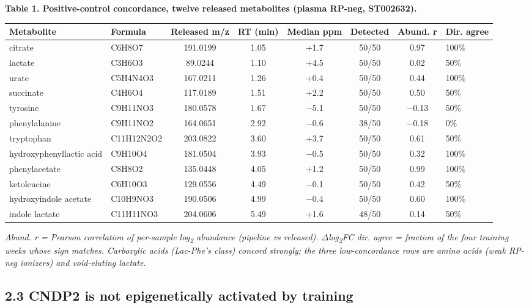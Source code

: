 \documentclass[11pt]{article}
\begin{document}
\textbf{Table 1. Positive-control concordance, twelve released metabolites (plasma RP-neg, ST002632).}

{\footnotesize\setlength{\tabcolsep}{4pt}
\begin{longtable}{llccccc p{1.7cm}}
\toprule
\textbf{Metabolite} & \textbf{Formula} & \textbf{Released m/z} & \textbf{RT (min)} & \textbf{Median ppm} & \textbf{Detected} & \textbf{Abund. r} & \textbf{Dir. agree} \\
\midrule\endhead
citrate & C6H8O7 & 191.0199 & 1.05 & +1.7 & 50/50 & 0.97 & 100\% \\
lactate & C3H6O3 & 89.0244 & 1.10 & +4.5 & 50/50 & 0.02 & 50\% \\
urate & C5H4N4O3 & 167.0211 & 1.26 & +0.4 & 50/50 & 0.44 & 100\% \\
succinate & C4H6O4 & 117.0189 & 1.51 & +2.2 & 50/50 & 0.50 & 50\% \\
tyrosine & C9H11NO3 & 180.0578 & 1.67 & $-$5.1 & 50/50 & $-$0.13 & 50\% \\
phenylalanine & C9H11NO2 & 164.0651 & 2.92 & $-$0.6 & 38/50 & $-$0.18 & 0\% \\
tryptophan & C11H12N2O2 & 203.0822 & 3.60 & +3.7 & 50/50 & 0.61 & 50\% \\
hydroxyphenyllactic acid & C9H10O4 & 181.0504 & 3.93 & $-$0.5 & 50/50 & 0.32 & 100\% \\
phenylacetate & C8H8O2 & 135.0448 & 4.05 & +1.2 & 50/50 & 0.99 & 100\% \\
ketoleucine & C6H10O3 & 129.0556 & 4.49 & $-$0.1 & 50/50 & 0.42 & 50\% \\
hydroxyindole acetate & C10H9NO3 & 190.0506 & 4.99 & $-$0.4 & 50/50 & 0.60 & 100\% \\
indole lactate & C11H11NO3 & 204.0606 & 5.49 & +1.6 & 48/50 & 0.14 & 50\% \\
\bottomrule
\end{longtable}
}

\textit{Abund. r = Pearson correlation of per-sample log\textsubscript{2} abundance (pipeline vs released). $\Delta$log\textsubscript{2}FC dir. agree = fraction of the four training weeks whose sign matches. Carboxylic acids (Lac-Phe's class) concord strongly; the three low-concordance rows are amino acids (weak RP-neg ionizers) and void-eluting lactate.}

\subsection*{2.3 CNDP2 is not epigenetically activated by training}
\end{document}
